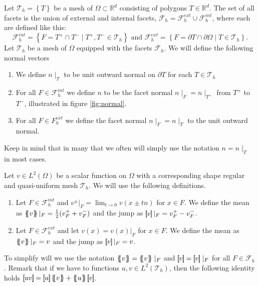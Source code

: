 Let $\mathcal{T}_{h}  = \left\{ T \right\} $ be a mesh of $\Omega \subset  \mathbb{R} ^d $ consisting of polygons $T \in \mathbb{R} ^{d}$.
The set of all facets is the union of external and internal facets, $\mathcal{F} _{h} = \mathcal{F} ^{ext}_{h} \cup \mathcal{F} _{h}^{int} $, where each are defined like this:
\[
            \mathcal{F}^{int} _{h}  = \left\{ F=T^{+}\cap T^{-}  \mid  T^{+}, T^{-} \in \mathcal{T}_{h}  \right\} \text{ and }
            \mathcal{F}^{ext} _{h}  = \left\{ F= \partial T \cap \partial \Omega    \mid  T  \in \mathcal{T}_{h}  \right\}.
\]
Let $\mathcal{T}_{h} $ be a mesh of $\Omega $ equipped with the facets $\mathcal{F}_{h} $. We will define the following normal vectors
\begin{enumerate}[label=\arabic*)]
    \item We define $n \mid _{T}$ to be unit outward normal on $\partial T$ for each $T \in \mathcal{T}_{h} $
 \item For all $F \in \mathcal{F }^{int} _{h}$ we define $n$ to be the facet normal $ n  \mid_F = n \mid _{T^{+}} $  from $T^{+}$ to $T^{-}$, illustrated in figure \ref{fig:normal}.
 \item For all $F \in F^{ext}_{h}$ we define the facet normal $n \mid _{F} = n \mid _{T} $ to the unit outward normal.
\end{enumerate}
Keep in mind that in many that we often will simply use the notation $n = n \mid _{T}$ in most cases.

    Let $v\in L^2( \Omega ) $ be a scalar function on $\Omega$ with a corresponding shape regular and quasi-uniform mesh $\mathcal{T}_{h} $. We will use the following definitions.
    \begin{enumerate}[label=\arabic*)]
        \item Let $F \in \mathcal{F}^{int} _{h}$ and $v^{\pm}| _{F} = \lim_{t\to 0} v( x \pm tn)   $ for $x \in F$. We define the mean as $\left\{\!\!\left\{ v\right\}\!\!\right\} |_{F} = \frac{1}{2} (v^{+}_{F} + v^{-}_{F})   $ and the jump as $\left[\!\!\left[ v \right]\!\!\right]|_{F} =  v^{+}_{F} - v^{-}_{F} $.
        \item Let $F \in \mathcal{F}^{ext} _{h}$ and let $ v( x) =  v(x)|_{F} $ for  $x \in F$.
We define the mean as $\left\{\!\!\left\{ v\right\}\!\!\right\} |_{F} = v    $ and the jump as $\left[\!\!\left[ v \right]\!\!\right]|_{F} = v$.

    \end{enumerate}
    To simplify will we use the notation $\mean{ v } = \mean{ v } \mid _{F}    $ and $\jump{ v } = \jump{ v } \mid _{F}    $ for all $F \in \mathcal{F} _{h}$.
    Remark that if we have to functions $u,v \in L^2( \mathcal{T}_{h} ) $, then the following identity holds $  \jump{ uv }    = \jump{ u }   \mean{ v }    + \mean{ u }  \jump{ v }$.


